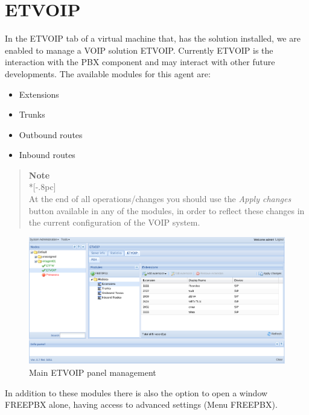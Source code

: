 \section{ETVOIP}
In the ETVOIP tab of a virtual machine that, has the solution installed, we are enabled to manage a VOIP solution ETVOIP.
Currently ETVOIP is the interaction with the PBX component and may interact with other future developments.
The available modules for this agent are:

\begin{itemize}
    \item Extensions
    \item Trunks
    \item Outbound routes
    \item Inbound routes
\end{itemize}


\begin{quote}
	{\large \bf Note} \\*[-.8pc]
	\underline{\hspace{6in}} \\
    At the end of all operations/changes you should use the \emph{Apply changes} button available in any of the modules, in order to reflect these changes in the current configuration of the VOIP system.
\end{quote}


\begin{figure}[H]
        \begin{center}
        \includegraphics[scale=0.45]{screenshots/etvoip_pbx.png}
        \caption{Main ETVOIP panel management}
        \label{fig:etvoip_pbx}
        \end{center}
\end{figure}

In addition to these modules there is also the option to open a window FREEPBX alone, having access to advanced settings (Menu FREEPBX).

